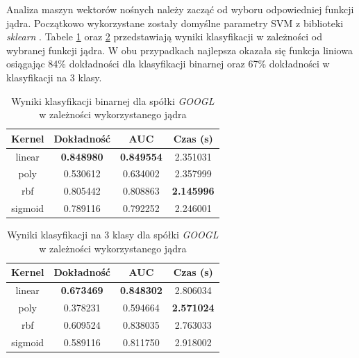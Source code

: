 \documentclass[a4paper, twoside, 11pt, openright]{article}
\begin{document}
Analiza maszyn wektorów nośnych należy zacząć od wyboru odpowiedniej funkcji jądra. Początkowo wykorzystane zostały domyślne parametry SVM z biblioteki \textit{sklearn} \cite{bib:sklearnsvm}. Tabele \ref{tab:svm_kernel_binary} oraz \ref{tab:svm_kernel_discrete} przedstawiają wyniki klasyfikacji w zależności od wybranej funkcji jądra. W obu przypadkach najlepsza okazała się funkcja liniowa osiągając 84\% dokładności dla klasyfikacji binarnej oraz 67\% dokładności w klasyfikacji na 3 klasy.
 

\begin{table}[H]
    \centering
    \begin{tabular}{|c|c|c|c|}
    \hline
        \textbf{Kernel} & \textbf{Dokładność} & \textbf{AUC} & \textbf{Czas (s)} \\ \hline
linear  &  \textbf{0.848980} &  \textbf{0.849554} &    2.351031 \\ \hline
poly    &  0.530612 &  0.634002 &    2.357999 \\ \hline
rbf     &  0.805442 &  0.808863 &    \textbf{2.145996} \\ \hline
sigmoid &  0.789116 &  0.792252 &    2.246001 \\ \hline
    \end{tabular}
    \caption{Wyniki klasyfikacji binarnej dla spółki \textit{GOOGL} w zależności wykorzystanego jądra}
    \label{tab:svm_kernel_binary}
\end{table}


\begin{table}[H]
    \centering
    \begin{tabular}{|c|c|c|c|}
    \hline
        \textbf{Kernel} & \textbf{Dokładność} & \textbf{AUC} & \textbf{Czas (s)} \\ \hline
linear  &  \textbf{0.673469} &  \textbf{0.848302} &    2.806034 \\ \hline
poly    &  0.378231 &  0.594664 &    \textbf{2.571024} \\ \hline
rbf     &  0.609524 &  0.838035 &    2.763033 \\ \hline
sigmoid &  0.589116 &  0.811750 &    2.918002 \\ \hline
    \end{tabular}
    \caption{Wyniki klasyfikacji na 3 klasy dla spółki \textit{GOOGL} w zależności wykorzystanego jądra}
    \label{tab:svm_kernel_discrete}
\end{table}
\end{document}

